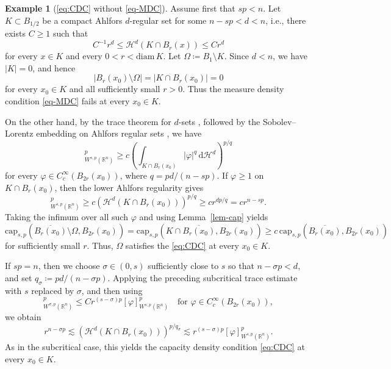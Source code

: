 \documentclass[11pt]{amsart}
\theoremstyle{plain}
\theoremstyle{definition}
\newtheorem{example}[theorem]{Example}
\numberwithin{equation}{section}
\begin{document}
\begin{example}[\eqref{eq:CDC} without \eqref{eq-MDC}]\label{ex-CDC-without-MDC}
Assume first that $sp < n$. Let $K \subset B_{1/2}$ be a compact Ahlfors $d$-regular set for some $n-sp<d<n$, i.e., there exists $C \geq 1$ such that
\begin{equation*}
C^{-1} r^d \leq \mathcal{H}^d(K \cap B_r(x)) \leq C r^d    
\end{equation*}
for every $x\in K$ and every $0<r<\mathrm{diam}\,K$. Let $\Omega \coloneqq B_1 \setminus K$. Since $d<n$, we have $|K|=0$, and hence
\begin{equation*}
|B_r(x_0) \setminus \Omega| = |K \cap B_r(x_0)| =0
\end{equation*}
for every $x_0 \in K$ and all sufficiently small $r>0$. Thus the measure density condition \eqref{eq-MDC} fails at every $x_0 \in K$.

On the other hand, by the trace theorem for $d$-sets \cite[Chapter~VII, Theorem~1]{JW84}, followed by the Sobolev--Lorentz embedding on Ahlfors regular sets \cite{Dyd10}, we have
\begin{equation*}
[\varphi]_{W^{s, p}(\mathbb{R}^n)}^p \geq c \left( \int_{K \cap B_r(x_0)} |\varphi|^q \,\mathrm{d}\mathcal{H}^d \right)^{p/q}
\end{equation*}
for every $\varphi \in C^\infty_c(B_{2r}(x_0))$, where $q=pd/(n-sp)$. If $\varphi \geq 1$ on $K \cap B_r(x_0)$, then the lower Ahlfors regularity gives
\begin{equation*}
[\varphi]_{W^{s, p}(\mathbb{R}^n)}^p \geq c \left( \mathcal{H}^d(K \cap B_r(x_0)) \right)^{p/q} \geq c r^{dp/q} = c r^{n-sp}.
\end{equation*}
Taking the infimum over all such $\varphi$ and using Lemma~\ref{lem-cap} yields
\begin{equation*}
\mathrm{cap}_{s, p}(\overline{B_r(x_0)} \setminus \Omega, B_{2r}(x_0)) = \mathrm{cap}_{s, p}(K \cap \overline{B_r(x_0)}, B_{2r}(x_0)) \geq c \, \mathrm{cap}_{s, p}(\overline{B_r(x_0)}, B_{2r}(x_0))
\end{equation*}
for sufficiently small $r$. Thus, $\Omega$ satisfies the \eqref{eq:CDC} at every $x_0 \in K$.

If $sp=n$, then we choose $\sigma \in (0,s)$ sufficiently close to $s$ so that $n-\sigma p<d$, and set $q_\sigma \coloneqq pd/(n-\sigma p)$. Applying the preceding subcritical trace estimate with $s$ replaced by $\sigma$, and then using
\begin{equation*}
[\varphi]_{W^{\sigma, p}(\mathbb{R}^n)}^p \leq C r^{(s-\sigma)p} [\varphi]_{W^{s, p}(\mathbb{R}^n)}^p \quad\text{for }\varphi \in C^{\infty}_c(B_{2r}(x_0)),
\end{equation*}
we obtain
\begin{equation*}
r^{n-\sigma p} \lesssim \left( \mathcal{H}^d(K \cap B_r(x_0)) \right)^{p/q_\sigma} \lesssim r^{(s-\sigma)p} [\varphi]_{W^{s, p}(\mathbb{R}^n)}^p.
\end{equation*}
As in the subcritical case, this yields the capacity density condition \eqref{eq:CDC} at every $x_0 \in K$.


\end{example}
\end{document}
